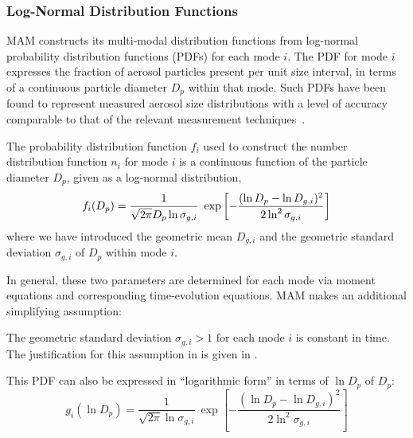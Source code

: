 \subsubsection*{Log-Normal Distribution Functions}

MAM constructs its multi-modal distribution functions from log-normal
probability distribution functions (PDFs) for each mode $i$. The PDF for mode
$i$ expresses the fraction of aerosol particles present per unit size interval,
in terms of a continuous particle diameter $D_p$ within that mode. Such PDFs
have been found to represent measured aerosol size distributions with a level of
accuracy comparable to that of the relevant measurement
techniques~\cite{Whitby1991}.

\begin{assume}
The probability distribution function $f_i$ used to construct
        the number distribution function $n_i$ for mode $i$ is a continuous
        function of the particle diameter $D_p$, given as a log-normal distribution,
        \begin{equation}\labeleq{log_normal_pdf}
  f_i(D_p) = \frac{1}{\sqrt{2\pi} D_p \ln \sigma_{g,i}} \ 
      \exp \left [-\frac{(\ln D_p - \ln D_{g,i})^2}{2\ln^2 \sigma_{g,i}} \right]
\end{equation}
where we have introduced the geometric mean $D_{g,i}$ and the geometric standard
deviation $\sigma_{g,i}$ of $D_p$ within mode $i$. 

\end{assume}


In general, these two parameters are determined for each mode via moment equations and corresponding time-evolution equations.
MAM makes an additional simplifying assumption:

\begin{assume}
  The geometric standard deviation $\sigma_{g,i}>1$ for each mode $i$ is constant in time.  
  The justification for this assumption in \cite{Easter2004,Wilson2001,Whitby1991} is given in \cite{Whitby1981}.
\end{assume}


This PDF can also be expressed in ``logarithmic form'' in terms of $\ln D_p$
of $D_p$:
\begin{equation}\label{eq:log_normal_pdf_log}
  g_i(\ln D_p) = \frac{1}{\sqrt{2\pi} \ln\sigma_{g,i}} \
      \exp \left [ -\frac{(\ln D_p - \ln D_{g,i})^2}{2\ln^2 \sigma_{g,i}} \right]
\end{equation}

